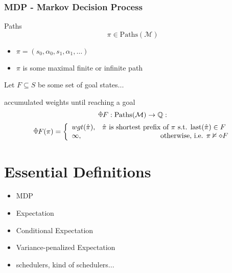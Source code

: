 \documentclass[onlymath]{beamer}
\begin{document}
\newcommand{\rawdiaplus}{%
	\begin{tikzpicture}
	\useasboundingbox (-0.7ex, -0.9ex) rectangle (0.7ex, 0.9ex);
	\node (w) at (-0.7ex,0) {};
	\node (e) at (+0.7ex,0) {};
	\node (s) at (0,-0.9ex) {};
	\node (n) at (0,+0.9ex) {};
	\draw (n.center) -- (e.center) -- (s.center) -- (w.center) -- (n.center);
	\draw (n.center) -- (s.center);
	\draw (e.center) -- (w.center);
	\end{tikzpicture}
}
\begin{frame}
	\frametitle{MDP - Markov Decision Process}
	\begin{block}{Paths}
		\[
			\pi \in \mathrm{Paths}(\mathcal{M})
		\] \begin{itemize}
			\item $\pi = (s_0,\alpha_0,s_1,\alpha_1, \dots)$
			\item $\pi$ is some maximal finite or infinite path
		\end{itemize}
	\end{block}
	Let $F \subseteq S$ be some set of goal states...
	\begin{block}{accumulated weights until reaching a goal}
	\[
	\rawdiaplus F : \mathrm{Paths}(\mathcal{M}) \to \mathbb{Q} :
	\]
	\[ 
	\rawdiaplus F (\pi) = \bigg\{\begin{array}{lr}
	wgt(\hat{\pi}), & \text{$\hat{\pi}$ is shortest prefix of $\pi$ s.t. $\mathrm{last}(\hat{\pi}) \in F$  }\\
	\infty, & \text{otherwise, i.e. $\pi \nvDash \diamond F$}
	\end{array}
	\]
	\end{block}

\end{frame}

\section{Essential Definitions}

\begin{frame}
\begin{itemize}
	\item MDP
	\item Expectation
	\item Conditional Expectation
	\item Variance-penalized Expectation
	\item schedulers, kind of schedulers...
\end{itemize}
\end{frame}
\end{document}
